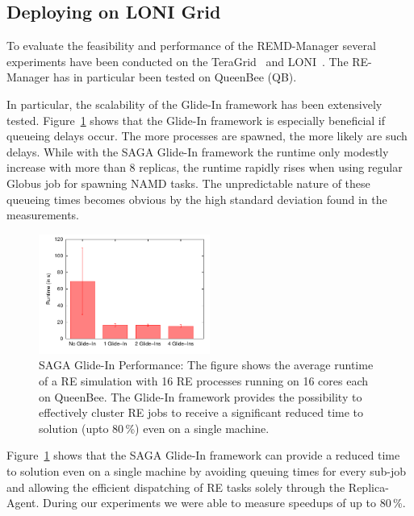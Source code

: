 \documentclass[conference,final]{IEEEtran}
\begin{document}
\subsection{Deploying on LONI Grid}

To evaluate the feasibility and performance of the REMD-Manager
several experiments have been conducted on the
TeraGrid~\cite{teragrid} and LONI~\cite{loni}.  The RE-Manager has in
particular been tested on QueenBee (QB).

In particular, the scalability of the Glide-In framework has been
extensively tested.  Figure~\ref{fig:perf_remd_glidin} shows that the
Glide-In framework is especially beneficial if queueing delays
occur. The more processes are spawned, the more likely are such
delays. While with the SAGA Glide-In framework the runtime only
modestly increase with more than 8 replicas, the runtime rapidly rises
when using regular Globus job for spawning NAMD tasks. The
unpredictable nature of these queueing times becomes obvious by the
high standard deviation found in the measurements.

\begin{figure}[htbp]
        \includegraphics[width=0.5\textwidth]{perf_glidein.pdf}
        \caption{SAGA Glide-In Performance: The figure shows the average runtime of a 
        RE simulation with 16 RE processes running on 16 cores each on QueenBee. 
        The Glide-In framework provides the possibility to effectively cluster
        RE jobs to receive a significant reduced time to solution (upto 80\,\%) 
        even on a single machine.}

    \label{fig:perf_remd_glidin}
\end{figure}

Figure~\ref{fig:perf_remd_glidin} shows that the SAGA Glide-In framework can provide
a reduced time to solution even on a single machine by avoiding queuing times for 
every sub-job and allowing the efficient dispatching of RE tasks solely through the 
Replica-Agent. During our experiments we were able to measure speedups of up to 80\,\%.
\end{document}
